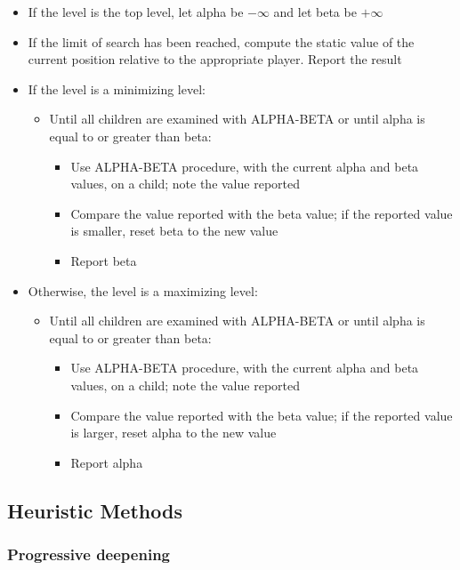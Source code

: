 \documentclass{article}
\begin{document}
\begin{itemize}
  \item If the level is the top level, let alpha be
    \(-\infty\) and let beta be \(+\infty\)
  \item If the limit of search has been reached, compute the
    static value of the current position relative to the
    appropriate player. Report the result
  \item If the level is a minimizing level:
    \begin{itemize}
      \item Until all children are examined with ALPHA-BETA or
        until alpha is equal to or greater than beta:
        \begin{itemize}
          \item Use ALPHA-BETA procedure, with the current alpha
            and beta values, on a child; note the value reported
          \item Compare the value reported with the beta value;
            if the reported value is smaller, reset beta to the
            new value
          \item Report beta
        \end{itemize}
    \end{itemize}
      \item Otherwise, the level is a maximizing level:
    \begin{itemize}
      \item Until all children are examined with ALPHA-BETA or
        until alpha is equal to or greater than beta:
        \begin{itemize}
          \item Use ALPHA-BETA procedure, with the current alpha
            and beta values, on a child; note the value reported
          \item Compare the value reported with the beta value;
            if the reported value is larger, reset alpha to the
            new value
          \item Report alpha
        \end{itemize}
    \end{itemize}
\end{itemize}

\subsection{Heuristic Methods}

\subsubsection{Progressive deepening}
\end{document}
